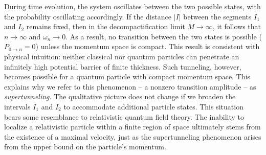 \documentclass[12pt,a4paper]{article}
\numberwithin{equation}{section}
\theoremstyle{theorem}
\theoremstyle{remark}
\begin{document}
During time evolution, the system oscillates between the two possible states, with the probability oscillating accordingly. 
If the distance $|I|$ between the segments $I_1$ and $I_2$ remains fixed, then in the decompactification limit $M\rightarrow \infty$, it follows that  $n\rightarrow \infty$ and $\omega_n \rightarrow 0$. As a result, no transition between the two states is possible ($P_{0\rightarrow n}=0$) unless the momentum space is compact. This result is consistent with physical intuition: neither classical nor quantum particles can penetrate an infinitely high potential barrier of finite thickness. Such tunneling, however, becomes possible for a quantum particle with compact momentum space.  This explains why we refer to this phenomenon -- a nonzero transition amplitude -- as {\it supertunneling}. The qualitative picture does not change if we broaden the intervals $I_1$ and $I_2$ to accommodate additional particle states.  This situation bears some resemblance to relativistic quantum field theory. The inability to localize a relativistic particle within a finite region of space ultimately stems from the existence of a maximal velocity, just as the supertunneling phenomenon arises from the upper bound on the particle's momentum.
\end{document}
